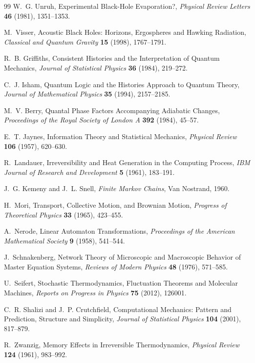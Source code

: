 \documentclass[11pt,oneside]{book}
\theoremstyle{definition}
\theoremstyle{remark}
\begin{document}
\begin{thebibliography}{99}
W.~G. Unruh,
Experimental Black-Hole Evaporation?,
\emph{Physical Review Letters} \textbf{46} (1981), 1351--1353.

M.~Visser,
Acoustic Black Holes: Horizons, Ergospheres and Hawking Radiation,
\emph{Classical and Quantum Gravity} \textbf{15} (1998), 1767--1791.

R.~B. Griffiths,
Consistent Histories and the Interpretation of Quantum Mechanics,
\emph{Journal of Statistical Physics} \textbf{36} (1984), 219--272.

C.~J. Isham,
Quantum Logic and the Histories Approach to Quantum Theory,
\emph{Journal of Mathematical Physics} \textbf{35} (1994), 2157--2185.

M.~V. Berry,
Quantal Phase Factors Accompanying Adiabatic Changes,
\emph{Proceedings of the Royal Society of London A} \textbf{392} (1984), 45--57.

E.~T. Jaynes,
Information Theory and Statistical Mechanics,
\emph{Physical Review} \textbf{106} (1957), 620--630.

R.~Landauer,
Irreversibility and Heat Generation in the Computing Process,
\emph{IBM Journal of Research and Development} \textbf{5} (1961), 183--191.

J.~G. Kemeny and J.~L. Snell,
\emph{Finite Markov Chains},
Van Nostrand, 1960.

H.~Mori,
Transport, Collective Motion, and Brownian Motion,
\emph{Progress of Theoretical Physics} \textbf{33} (1965), 423--455.

A.~Nerode,
Linear Automaton Transformations,
\emph{Proceedings of the American Mathematical Society} \textbf{9} (1958), 541--544.

J.~Schnakenberg,
Network Theory of Microscopic and Macroscopic Behavior of Master Equation Systems,
\emph{Reviews of Modern Physics} \textbf{48} (1976), 571--585.

U.~Seifert,
Stochastic Thermodynamics, Fluctuation Theorems and Molecular Machines,
\emph{Reports on Progress in Physics} \textbf{75} (2012), 126001.

C.~R. Shalizi and J.~P. Crutchfield,
Computational Mechanics: Pattern and Prediction, Structure and Simplicity,
\emph{Journal of Statistical Physics} \textbf{104} (2001), 817--879.

R.~Zwanzig,
Memory Effects in Irreversible Thermodynamics,
\emph{Physical Review} \textbf{124} (1961), 983--992.

\end{thebibliography}
\end{document}
